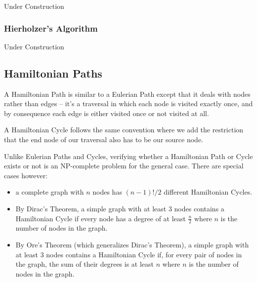 Under Construction

\subsubsection{Hierholzer's Algorithm}

Under Construction

\subsection{Hamiltonian Paths}
 

A Hamiltonian Path is similar to a Eulerian Path except that it deals with nodes rather than edges -- it's a traversal in which each node is visited exactly once, and by consequence each edge is either visited once or not visited at all.

A Hamiltonian Cycle follows the same convention where we add the restriction that the end node of our traversal also has to be our source node.

Unlike Eulerian Paths and Cycles, verifying whether a Hamiltonian Path or Cycle exists or not is an NP-complete problem for the general case. There are special cases however:
\begin{itemize}
\item a complete graph with $n$ nodes has $(n-1)!/2$ different Hamiltonian Cycles.
\item By Dirac's Theorem, a simple graph with at least 3 nodes contains a Hamiltonian Cycle if every node has a degree of at least $\frac{n}{2}$ where $n$ is the number of nodes in the graph.
\item By Ore's Theorem (which generalizes Dirac's Theorem), a simple graph with at least 3 nodes contains a Hamiltonian Cycle if, for every pair of nodes in the graph, the sum of their degrees is at least $n$ where $n$ is the number of nodes in the graph.
\end{itemize}
